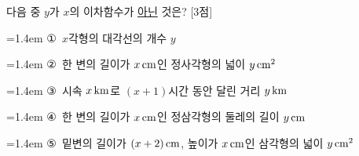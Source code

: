 다음 중 $y$가 $x$의 이차함수가 \underline{아닌} 것은? \mbox{[3점]}
\par\medskip\par\noindent\hangindent=1.4em {\small ①}\ $x$각형의 대각선의 개수 $y$\par\noindent\hangindent=1.4em {\small ②}\ 한 변의 길이가 $x\mkern3mu \mathrm{cm}$인 정사각형의 넓이 $y\mkern3mu \mathrm{cm}^2$\par\noindent\hangindent=1.4em {\small ③}\ 시속 $x\mkern3mu \mathrm{km}$로 $(x+1)$시간 동안 달린 거리 $y\mkern3mu \mathrm{km}$\par\noindent\hangindent=1.4em {\small ④}\ 한 변의 길이가 $x\mkern3mu \mathrm{cm}$인 정삼각형의 둘레의 길이 $y\mkern3mu \mathrm{cm}$\par\noindent\hangindent=1.4em {\small ⑤}\ 밑변의 길이가 $(x+2)\mkern3mu \mathrm{cm}$, 높이가 $x\mkern3mu \mathrm{cm}$인 삼각형의 넓이 $y\mkern3mu \mathrm{cm}^2$\par\medskip
